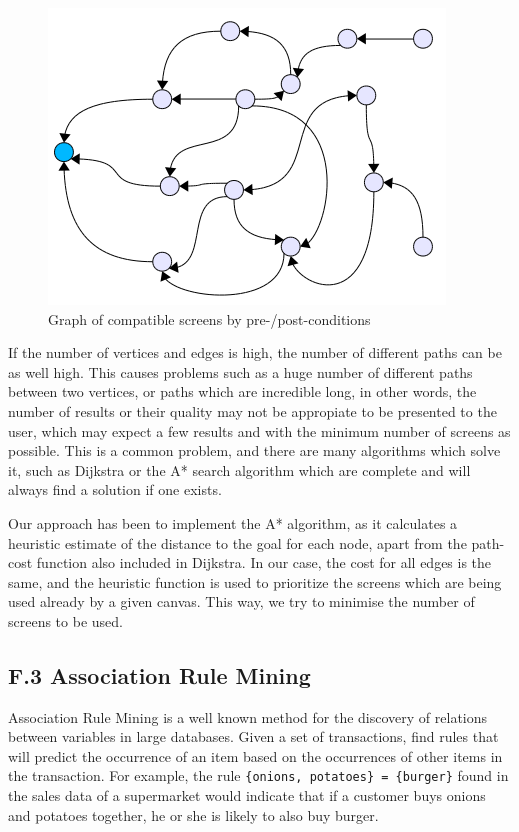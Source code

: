 \documentclass{fast_latex}
\begin{document}
\begin{figure}[htb]
\label{fig:screens_graph}
\begin{center}
	\includegraphics{images/screens_graph}
	\caption{Graph of compatible screens by pre-/post-conditions}
\end{center}
\end{figure}

If the number of vertices and edges is high, the number of different paths can be as well high. This causes problems such as a huge number of different paths between two vertices, or paths which are incredible long, in other words, the number of results or their quality may not be appropiate to be presented to the user, which may expect a few results and with the minimum number of screens as possible. This is a common problem, and there  are many algorithms which solve it, such as Dijkstra or the A* search algorithm which are complete and will always find a solution if one exists.

Our approach has been to implement the A* algorithm, as it calculates a heuristic estimate of the distance to the goal for each node, apart from the path-cost function also included in Dijkstra. In our case, the cost for all edges is the same, and the heuristic function is used to prioritize the screens which are being used already by a given canvas. This way, we try to minimise the number of screens to be used.


\subsection*{F.3 Association Rule Mining}

Association Rule Mining is a well known method for the discovery of relations between variables in large databases. Given a set of transactions, find rules that will predict the occurrence of an item based on the occurrences of other items in the transaction. For example, the rule \verb|{onions, potatoes} = {burger}| found in the sales data of a supermarket would indicate that if a customer buys onions and potatoes together, he or she is likely to also buy burger. 
\end{document}
